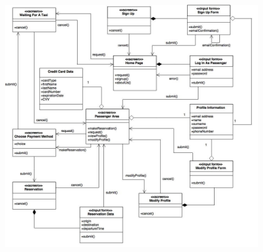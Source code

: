 \documentclass[18pt,oneside,a4paper, titlepage]{article}
\begin{document}
		\newpage
		\begin{figure}[h]
			\centering
			\includegraphics[scale=0.46]{Diagrams/UXDiagramPassenger.jpg}
		\end{figure}
\newpage
\end{document}
